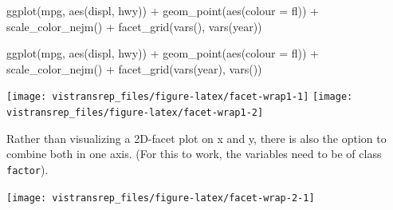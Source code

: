 \documentclass[]{book}
\newenvironment{Shaded}{}{}
\newcommand{\DataTypeTok}[1]{#1}
\newcommand{\KeywordTok}[1]{\textcolor[rgb]{0.00,0.00,1.00}{#1}}
\newcommand{\NormalTok}[1]{#1}
\newcommand{\OperatorTok}[1]{#1}
\newcommand{\StringTok}[1]{\textcolor[rgb]{0.00,0.50,0.50}{#1}}
\begin{document}
\begin{Shaded}
\begin{Highlighting}[]
\KeywordTok{ggplot}\NormalTok{(mpg, }\KeywordTok{aes}\NormalTok{(displ, hwy)) }\OperatorTok{+}
\StringTok{  }\KeywordTok{geom_point}\NormalTok{(}\KeywordTok{aes}\NormalTok{(}\DataTypeTok{colour =}\NormalTok{ fl)) }\OperatorTok{+}
\StringTok{  }\KeywordTok{scale_color_nejm}\NormalTok{() }\OperatorTok{+}
\StringTok{  }\KeywordTok{facet_grid}\NormalTok{(}\KeywordTok{vars}\NormalTok{(), }\KeywordTok{vars}\NormalTok{(year))}

\KeywordTok{ggplot}\NormalTok{(mpg, }\KeywordTok{aes}\NormalTok{(displ, hwy)) }\OperatorTok{+}
\StringTok{  }\KeywordTok{geom_point}\NormalTok{(}\KeywordTok{aes}\NormalTok{(}\DataTypeTok{colour =}\NormalTok{ fl)) }\OperatorTok{+}
\StringTok{  }\KeywordTok{scale_color_nejm}\NormalTok{() }\OperatorTok{+}
\StringTok{  }\KeywordTok{facet_grid}\NormalTok{(}\KeywordTok{vars}\NormalTok{(year), }\KeywordTok{vars}\NormalTok{()) }
\end{Highlighting}
\end{Shaded}

\begin{flushright}\texttt{[image: vistransrep\_files/figure-latex/facet-wrap1-1]} \texttt{[image: vistransrep\_files/figure-latex/facet-wrap1-2]} \end{flushright}

Rather than visualizing a 2D-facet plot on x and y, there is also the option to combine both in one axis.
(For this to work, the variables need to be of class \texttt{factor}).

\begin{Shaded}
\end{Shaded}

\begin{flushright}\texttt{[image: vistransrep\_files/figure-latex/facet-wrap-2-1]} \end{flushright}
\end{document}

